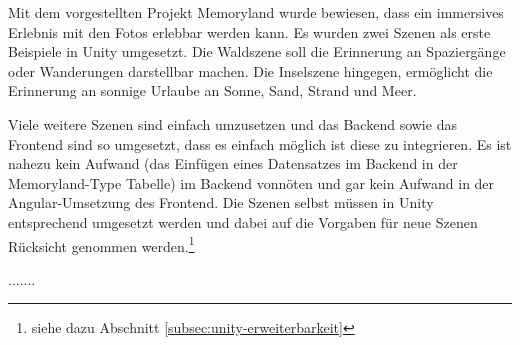


Mit dem vorgestellten Projekt Memoryland wurde bewiesen, dass ein immersives Erlebnis mit den Fotos erlebbar werden kann. Es wurden zwei Szenen als erste Beispiele in Unity umgesetzt. Die Waldszene soll die Erinnerung an Spaziergänge oder Wanderungen darstellbar machen. Die Inselszene hingegen, ermöglicht die Erinnerung an sonnige Urlaube an Sonne, Sand, Strand und Meer.

Viele weitere Szenen sind einfach umzusetzen und das Backend sowie das Frontend sind so umgesetzt, dass es einfach möglich ist diese zu integrieren. Es ist nahezu kein Aufwand (das Einfügen eines Datensatzes im Backend in der Memoryland-Type Tabelle) im Backend vonnöten und gar kein Aufwand in der Angular-Umsetzung des Frontend. Die Szenen selbst müssen in Unity entsprechend umgesetzt werden und dabei auf die Vorgaben für neue Szenen Rücksicht genommen werden.\footnote{siehe dazu Abschnitt \ref{subsec:unity-erweiterbarkeit}}

.......


